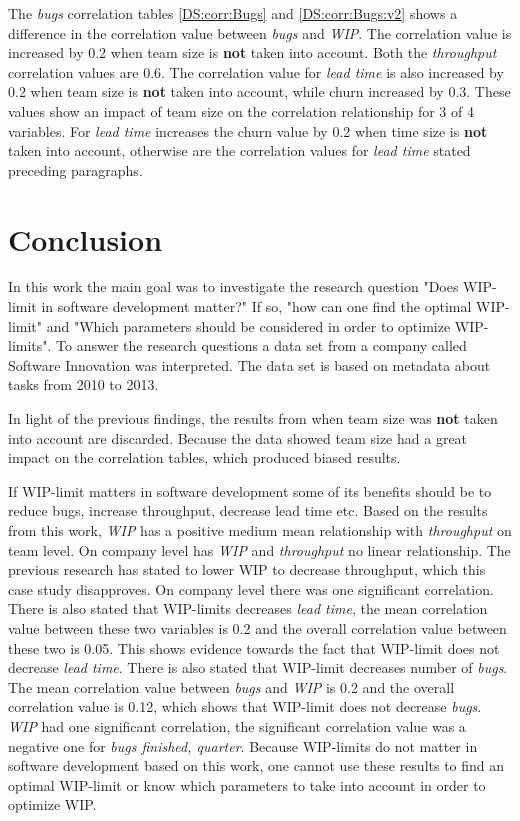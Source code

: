 \documentclass[UKenglish]{ifimaster}  %
\begin{document}
The \textit{bugs} correlation tables \ref{DS:corr:Bugs} and \ref{DS:corr:Bugs:v2} shows a difference in the correlation value between \textit{bugs} and \textit{WIP}. The correlation value is increased by 0.2 when team size is \textbf{not} taken into account. Both the \textit{throughput} correlation values are 0.6. The correlation value for \textit{lead time} is also increased by 0.2 when team size is \textbf{not} taken into account, while churn increased by 0.3. These values show an impact of team size on the correlation relationship for 3 of 4 variables. For \textit{lead time} increases the churn value by 0.2 when time size is \textbf{not} taken into account, otherwise are the correlation values for \textit{lead time} stated preceding paragraphs. 
\fi



\chapter{Conclusion}
\label{ch:conc}
In this work the main goal was to investigate the research question "Does WIP-limit in software development matter?" If so, "how can one find the optimal WIP-limit" and "Which parameters should be considered in order to optimize WIP-limits".  To answer the research questions a data set from a company called Software Innovation was interpreted. The data set is based on metadata about tasks from 2010 to 2013.

In light of the previous findings, the results from when team size was \textbf{not} taken into account are discarded. Because the data showed team size had a great impact on the correlation tables, which produced biased results.


If WIP-limit matters in software development some of its benefits should be to reduce bugs, increase throughput, decrease lead time etc. Based on the results from this work, \textit{WIP} has a positive medium mean relationship with \textit{throughput} on team level. On company level has \textit{WIP} and \textit{throughput} no linear relationship. The previous research has stated to lower WIP to decrease throughput, which this case study disapproves. On company level there was one significant correlation. There is also stated that WIP-limits decreases \textit{lead time}, the mean correlation value between these two variables is 0.2 and the overall correlation value between these two is 0.05. This shows evidence towards the fact that WIP-limit does not decrease \textit{lead time}. There is also stated that WIP-limit decreases number of \textit{bugs}. The mean correlation value between \textit{bugs} and \textit{WIP} is 0.2 and the overall correlation value is 0.12, which shows that WIP-limit does not decrease \textit{bugs}.  \textit{WIP} had one significant correlation, the significant correlation value was a negative one for \textit{bugs finished, quarter}. Because WIP-limits do not matter in software development based on this work, one cannot use these results to find an optimal WIP-limit or know which parameters to take into account in order to optimize WIP.
\end{document}
